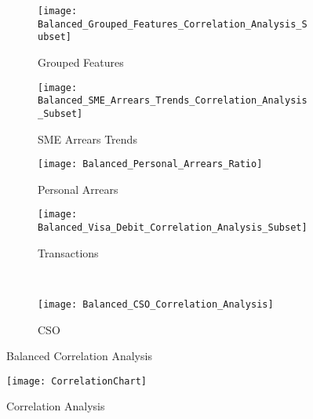 \begin{figure}[H]
	\centering
	\begin{subfigure}[b]{0.32\textwidth}
		\captionsetup{font=scriptsize}
		\texttt{[image: Balanced\_Grouped\_Features\_Correlation\_Analysis\_Subset]}\caption{Grouped Features}\label{fig:groupedFeaturesCorrelation}
	\end{subfigure} 
	\begin{subfigure}[b]{0.32\textwidth}
		\captionsetup{font=scriptsize}
		\texttt{[image: Balanced\_SME\_Arrears\_Trends\_Correlation\_Analysis\_Subset]}
		\caption{SME Arrears Trends}\label{fig:smeArrearsCorrelation}
	\end{subfigure} 
	\begin{subfigure}[b]{0.32\textwidth}
		\captionsetup{font=scriptsize}
		\texttt{[image: Balanced\_Personal\_Arrears\_Ratio]}
		\caption{Personal Arrears}\label{fig:personalArrearsCorrelation}
	\end{subfigure} 
	\medskip
	\begin{subfigure}[b]{0.32\textwidth}
		\captionsetup{font=scriptsize}
		\texttt{[image: Balanced\_Visa\_Debit\_Correlation\_Analysis\_Subset]}
		\caption{Transactions}\label{fig:transVisaCorrelation}
	\end{subfigure} ~\quad
	\begin{subfigure}[b]{0.32\textwidth}
		\captionsetup{font=scriptsize}
		\texttt{[image: Balanced\_CSO\_Correlation\_Analysis]}
		\caption{CSO}\label{fig:CSOCorrelation}
	\end{subfigure}
	\caption{Balanced Correlation Analysis}
	\label{fig:balanced_corr_analysis}
\end{figure}

\begin{figure}[H]
	\texttt{[image: CorrelationChart]}
	\caption{Correlation Analysis}
	\label{fig:Correlation Analysis}
\end{figure}

